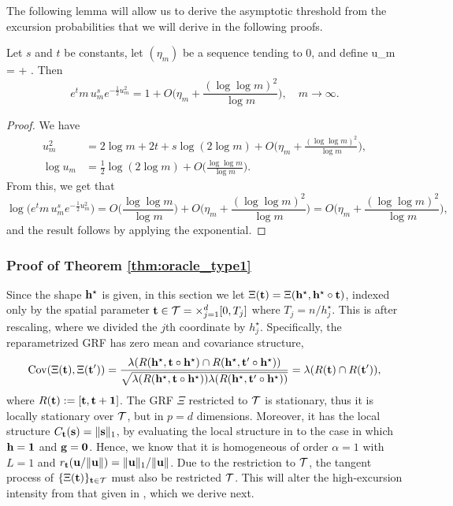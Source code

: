 \documentclass[twoside,11pt]{article}
\begin{document}
The following lemma will allow us to derive the asymptotic threshold from the excursion probabilities that we will derive in the following proofs.

\begin{lemma}
\label{lem:u_rate}
Let $s$ and $t$ be constants, let $(\eta_m)$ be a sequence tending to 0, and define
\beq\label{u_rate}
u_m =  + .
\eeq
Then
\[
e^t m \, u_m^s e^{- \frac 12 u_m^2}  = 1 + O\Big(\eta_m + \frac{(\log\log m)^2}{\log m}\Big), \quad m \to \infty.
\]
\end{lemma}

\begin{proof}
We have
\[\begin{split}
u_m^2 &= 2 \log m + 2 t + s \log (2 \log m) + O\Big(\eta_m + \frac{(\log\log m)^2}{\log m}\Big), \\
\log u_m &= \tfrac12 \log(2 \log m) + O\Big(\frac{\log\log m}{\log m}\Big).
\end{split}\]
From this, we get that
\[
\log\Big(e^t m\, u_m^s e^{- \frac 12 u_m^2}\Big) =  O\Big(\frac{\log\log m}{\log m}\Big) + O\Big(\eta_m + \frac{(\log\log m)^2}{\log m}\Big) = O\Big(\eta_m + \frac{(\log\log m)^2}{\log m}\Big),
\]
and the result follows by applying the exponential.
\end{proof}



\subsubsection{Proof of Theorem \ref{thm:oracle_type1}}
\label{sec:proof_oracle_type1}
Since the shape $\mathbf{h}^\star$ is given, in this section we let $\Xi(\mathbf{t}) = \Xi(\mathbf{h}^\star, \mathbf{h}^\star \circ \mathbf{t})$, indexed only by the spatial parameter $\mathbf{t} \in {\mathcal{T}} = \times_{j = 1}^d [0,T_j]$ where $T_j = n / h^\star_j$.
This is after rescaling, where we divided the $j$th coordinate by $h^\star_j$.
Specifically, the reparametrized GRF has zero mean and covariance structure,
\[
\operatorname*{Cov} ( \Xi(\mathbf{t}), \Xi(\mathbf{t}')) = \frac{\lambda(R(\mathbf{h}^\star,\mathbf{t} \circ \mathbf{h}^\star) \cap R(\mathbf{h}^\star, \mathbf{t}' \circ \mathbf{h}^\star))}{\sqrt{\lambda(R(\mathbf{h}^\star,\mathbf{t} \circ \mathbf{h}^\star))\lambda(R(\mathbf{h}^\star, \mathbf{t}' \circ \mathbf{h}^\star))}} = \lambda(R(\mathbf{t}) \cap R(\mathbf{t}')),
\]
where $R(\mathbf{t}) := [\mathbf{t}, \mathbf{t} + {\bf 1}]$. 
The GRF $\Xi$ restricted to ${\mathcal{T}}$ is stationary, thus it is locally stationary over ${\mathcal{T}}$, but in $p = d$ dimensions.
Moreover, it has the local structure $C_{\mathbf{t}}(\mathbf{s}) = \| \mathbf{s} \|_1$, by evaluating the local structure in  to the case in which $\mathbf{h} = {\bf 1}$ and $\mathbf{g} = {\bf 0}$.
Hence, we know that it is homogeneous of order $\alpha = 1$ with $L = 1$ and $r_{\mathbf{t}}(\mathbf{u}/\|\mathbf{u}\|) = \| \mathbf{u} \|_1 / \|\mathbf{u}\|$.
Due to the restriction to ${\mathcal{T}}$, the tangent process of $\{\Xi(\mathbf{t})\}_{\mathbf{t} \in {\mathcal{T}}}$ must also be restricted ${\mathcal{T}}$.
This will alter the high-excursion intensity from that given in , which we derive next.
\end{document}
